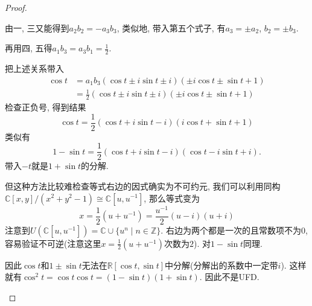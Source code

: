 \documentclass{../solutions-cn}
\begin{document}
\begin{proof}
\begin{enumerate}[(1)]
    由一, 三又能得到$a_2b_2 = -a_3b_3$, 类似地, 带入第五个式子, 有$a_3 = \pm a_2$, $b_2 = \pm b_3$.

    再用四, 五得$a_1b_3 = a_3b_1 = \frac{1}{2}$.

    把上述关系带入
    \[
    \begin{aligned}
        \cos t &= a_1b_3(\cos t \pm i\sin t \pm i)(\pm i\cos t \pm \sin t + 1)\\
        &= \frac{1}{2}(\cos t \pm i\sin t \pm i)(\pm i\cos t \pm \sin t + 1)
    \end{aligned}
    \]
    检查正负号, 得到结果
    \[
        \cos t = \frac{1}{2}(\cos t + i\sin t - i)(i\cos t + \sin t + 1)  
    \]
    类似有
    \[
        1 - \sin t = \frac{1}{2}(\cos t + i\sin t - i)(\cos t - i\sin t + i).
    \]
    带入$-t$就是$1 + \sin t$的分解.
    
    但这种方法比较难检查等式右边的因式确实为不可约元, 我们可以利用同构$\mathbb{C}[x, y]/(x^2 + y^2 - 1) \cong \mathbb{C}[u, u^{-1}]$, 那么等式变为
    \[
        x = \frac{1}{2}(u + u^{-1}) = \frac{u^{-1}}{2}(u - i)(u + i)
    \]
    注意到$U(\mathbb{C}[u, u^{-1}]) = \mathbb{C} \cup \{u^n \mid n \in \mathbb{Z}\}$. 右边为两个都是一次的且常数项不为$0$, 容易验证不可逆(注意这里$x = \frac{1}{2}(u + u^{-1})$次数为$2$). 对$1 - \sin t$同理.
    
    因此$\cos t$和$1 \pm \sin t$无法在$\mathbb{R}[\cos t, \sin t]$中分解(分解出的系数中一定带$i$). 这样就有$\cos^2 t = \cos t\cos t = (1 - \sin t)(1 + \sin t)$. 因此不是UFD.
\end{enumerate}
\end{proof}
\end{document}
